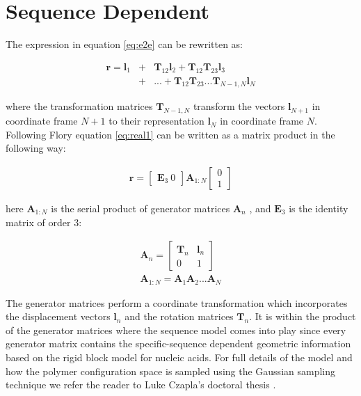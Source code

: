 \section{Sequence Dependent}
The expression in equation \ref{eq:e2e} can be rewritten as:

\begin{eqnarray}
\label{eq:real1}  
\textbf{r} = \textbf{l}_{1} & + & \textbf{T}_{12}\textbf{l}_{2}
+\textbf{T}_{12}\textbf{T}_{23}\textbf{l}_{3} \nonumber \\
 & + & ... + \textbf{T}_{12}\textbf{T}_{23}...\textbf{T}_{N-1,N} \textbf{l}_{N}
\end{eqnarray}

where the transformation matrices $\textbf{T}_{N-1,N}$ transform the
vectors $\textbf{l}_{N+1}$ in coordinate frame $N+1$ to their
representation $\textbf{l}_{N}$ in coordinate frame $N$.
Following Flory \cite{flory1969} equation \ref{eq:real1} can be
written as a matrix product in the following way:

\begin{gather}
\textbf{r}= \begin{bmatrix}\textbf{E}_{3}~ 0 \end{bmatrix} \textbf{A}_{1:N}\begin{bmatrix} 0 \\ 1 \end{bmatrix}
\end{gather}

here $\textbf{A}_{1:N}$ is the serial product of generator matrices
$\textbf{A}_{n}$ \cite{marky1994a}, and $\textbf{E}_{3}$ is the
identity matrix of order 3:

\begin{gather}
\textbf{A}_{n} =
\begin{bmatrix}
\textbf{T}_{n} & \textbf{l}_{n} \\
0 & 1
\end{bmatrix}\\
\textbf{A}_{1:N}=\textbf{A}_{1}\textbf{A}_{2}...\textbf{A}_{N}
\end{gather}

The  generator  matrices  perform  a coordinate  transformation  which
incorporates  the   displacement  vectors  $\textbf{l}_{n}$   and  the
rotation matrices  $\textbf{T}_{n}$. It is  within the product  of the
generator  matrices where  the sequence  model comes  into  play since
every  generator  matrix  contains  the  specific-sequence  dependent
geometric  information based  on  the rigid  block  model for  nucleic
acids.  For full details of the model and how the polymer configuration
space is  sampled using the  Gaussian sampling technique we  refer the
reader to Luke Czapla's doctoral thesis \cite{czapla2009}.








